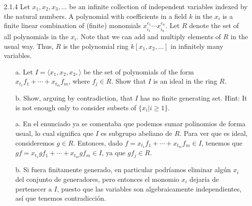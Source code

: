 \documentclass[twoside]{article}
\begin{document}
\begin{ejercicio}{2.1.4}
Let $x_1, x_2, x_3,\dots$  be an infinite collection of independent variables indexed by the natural
numbers. A polynomial with coefficients in a field $k$ in the $x_i$ is a finite linear combination
of (finite) monomials $x^{e_1}_{i_1}\cdots x^{e_n}_{i_n}$. Let $R$ denote the set of all polynomials in the $x_i$. Note that
we can add and multiply elements of $R$ in the usual way. Thus, $R$ is the polynomial ring
$k[x_1, x_2,\dots]$ in infinitely many variables.
\begin{itemize}
\item[]
\item[a.] Let $I = 
\langle x_1, x_2, x_3,\rangle$ be the set of polynomials of the form $x_{t_1} f_1+\cdots+x_{t_m} f_m$, where
$f_j ∈ R$. Show that $I$ is an ideal in the ring $R$.
\item[b.] Show, arguing by contradiction, that $I$ has no finite generating set. Hint: It is not enough
only to consider subsets of $\{x_i | i ≥ 1\}$.
\end{itemize}
\end{ejercicio}
\begin{solucion}
\begin{itemize}
\item[a.] En el enunciado ya se comentaba que podemos sumar polinomios de forma usual, lo cual significa que $I$ es subgrupo abeliano de $R$. Para ver que es ideal, consideremos $g\in R$. Entonces, dado $f= x_{t_1} f_1+\cdots+x_{t_m} f_m\in I$, tenemos que $gf=x_{t_1}g f_1+\cdots+x_{t_m}g f_m\in I$, ya que $gf_j\in R$. 
\item[b.] Si fuera finitamente generado, en particular podríamos eliminar algún $x_i$ del conjunto de generadores, pero entonces el monomio $x_i$ dejaría de pertenecer a $I$, puesto que las variables son algebraicamente independientes, así que tenemos contradicción. 
\end{itemize}
\end{solucion}
\newpage
\end{document}
